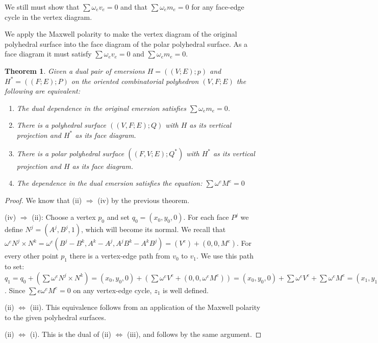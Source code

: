 \documentclass[11pt]{article}
\newtheorem{theorem}{Theorem}[section]
\theoremstyle{definition}
\begin{document}
 	We still must show that $\sum \omega_e v_e = 0$ and that $\sum \omega_em_e = 0$ for any face-edge cycle in the vertex diagram. 

	We apply the Maxwell polarity to make the vertex diagram of the original polyhedral surface into the face diagram of the polar polyhedral surface. 
	As a face diagram it must satisfy $\sum \omega_e v_e = 0$ and $\sum \omega_em_e = 0$.

	\begin{theorem} 
		Given a dual pair of emersions $H=((V;E);p)$ and $H^* = ((F;E);P)$ on the oriented combinatorial polyhedron $(V,F;E)$ the following are equivalent: 
 		\begin{enumerate} 
 			\item The dual dependence in the original emersion satisfies $\sum \omega_em_e = 0$.
 			\item There is a polyhedral surface $((V,F;E);Q)$ with $H$ as its vertical projection and $H^*$ as its face diagram.
			\item There is a polar polyhedral surface $((F,V;E);Q^*)$ with $H^*$ as its vertical projection and $H$ as its face diagram.
			\item The dependence in the dual emersion satisfies the equation: $\sum \omega^eM^e = 0$
		\end{enumerate}
	\end{theorem}
	
	\begin{proof}
		We know that (ii) $\Rightarrow$ (iv) by the previous theorem. 

		(iv) $\Rightarrow$ (ii): 
		Choose a vertex $p_0$ and set $q_0 = (x_0, y_0,0)$. 
		For each face $P^j$ we define $N^j = (A^j,B^j,1)$, which will become its normal. 
		We recall that $\omega^eN^j \times N^k = \omega^e(B^j-B^k,A^k-A^j, A^jB^k-A^kB^j) = (V^e) + (0,0,M^e)$. 
		For every other point $p_1$ there is a vertex-edge path from $v_0$ to $v_1$. 
		We use this path to set: 
		$q_1 = q_0 + (\sum \omega^eN^j \times N^k) = (x_0,y_0,0) + (\sum \omega^eV^e + (0,0,\omega^eM^e)) = (x_0,y_0,0) + \sum \omega^eV^e + \sum \omega^eM^e = (x_1,y_1,0) + (0,0,\sum \omega_eM^e)$. 
		Since $\sum{e}\omega^eM^e = 0$ on any vertex-edge cycle, $z_1$ is well defined.

		(ii) $\Leftrightarrow$ (iii). 
		This equivalence follows from an application of the Maxwell polarity to the given polyhedral surfaces.

		(ii) $\Leftrightarrow$ (i). 
		This is the dual of (ii) $\Leftrightarrow$ (iii), and follows by the same argument. 
	\end{proof}
 
\end{document}
